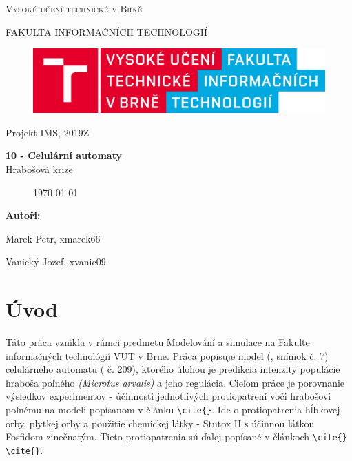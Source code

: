 \documentclass[a4paper,11pt]{article}
\begin{document}

\begin{titlepage}
\begin{center}
    {\Huge \textsc{Vysoké učení technické v Brně}}
    
    {\LARGE \uppercase{FAKULTA INFORMAČNÍCH TECHNOLOGIÍ}}
    
\begin{figure}[h]
\vspace{5.0cm}
\centering
\includegraphics[scale=0.15]{logo.png}
\vspace{-10.0cm}
\end{figure}
    
	{\LARGE Projekt IMS, 2019Z}

	{\Huge \textbf{10 - Celulární automaty}}
\\

{\LARGE {Hrabošová krize}}\\

\begin{figure}[h]
\centering
{\Large {\mydate\today}}
\vspace{6cm}
\end{figure}

\end{center}
\begin{compactitem}
\item[] \textbf{Autoři:}
\item[] Marek Petr, xmarek66
\item[] Vanický Jozef, xvanic09
\end{compactitem}

\end{titlepage}

\tableofcontents
\newpage

\section{Úvod}
Táto práca vznikla v rámci predmetu Modelování a simulace na Fakulte informačných technológií VUT v Brne. Práca popisuje model (\cite{slajdy}, snímok č. 7) celulárneho automatu (\cite{slajdy} č. 209), ktorého úlohou je predikcia intenzity populácie hraboša poľného \textit{(Microtus arvalis)} a jeho regulácia. Cieľom práce je porovnanie výsledkov experimentov - účinnosti jednotlivých protiopatrení voči hrabošovi poľnému na modeli popísanom v článku \verb|\cite{}|. Ide o protiopatrenia hĺbkovej orby, plytkej orby a použitie chemickej látky - Stutox II s účinnou látkou Fosfidom zinečnatým. Tieto protiopatrenia sú ďalej popísané v článkoch \verb|\cite{}| \verb|\cite{}|. 
\end{document}
